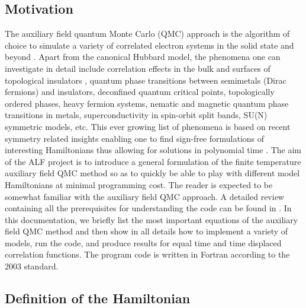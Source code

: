 
\subsection{Motivation}

The auxiliary field quantum Monte Carlo (QMC) approach is the algorithm of choice to simulate a variety of correlated electron systems in the solid state and beyond \cite{Blankenbecler81,White89,Assaad08_rev}.  
Apart from the canonical Hubbard model, the phenomena  one can investigate in detail include correlation effects in the bulk and surfaces of topological insulators \cite{Hohenadler10}, quantum phase transitions between semimetals (Dirac fermions)  and insulators,  
deconfined quantum critical points, topologically ordered phases, heavy fermion systems, nematic and magnetic quantum phase transitions in metals,   superconductivity in spin-orbit split bands, SU(N) symmetric models,  etc. 
This ever growing list of phenomena is based on  recent symmetry related insights enabling one to  find  sign-free formulations of  interesting  Hamiltonians thus allowing for solutions in polynomial time \cite{Wu04,Huffman14,Yao14a,Wei16}.   
The aim of the ALF project is to introduce a general formulation of the finite temperature  auxiliary field QMC method  so as to quickly be able to play with different model Hamiltonians  at  minimal programming cost.      
The reader is expected to be somewhat familiar with the auxiliary field QMC  approach. A detailed review containing all  the prerequisites for understanding  the code can be found in \cite{Assaad08_rev}.    
In this documentation, we briefly list the most important equations of the auxiliary field QMC method and then show in all details how to implement a variety of models, run the code, and produce  results for  equal time and time displaced correlation functions. 
The program code is written in Fortran according to the 2003 standard. 


\subsection{Definition of the Hamiltonian}

